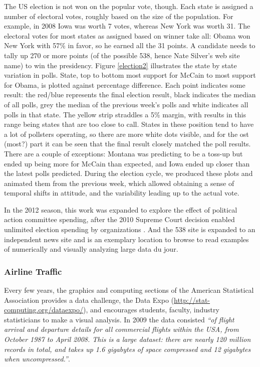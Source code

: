 \documentclass{article}
\begin{document}
The US election is not won on the popular vote, though. Each state is assigned a number of electoral votes, roughly based on the size of the population. For example, in 2008 Iowa was worth 7 votes, whereas New York was worth 31. The electoral votes for most states as assigned based on winner take all: Obama won New York with 57\% in favor, so he earned all the 31 points. A candidate needs to tally up 270 or more points (of the possible 538, hence Nate Silver's web site name) to win the presidency. Figure \ref{election2} illustrates the state by state variation in polls. State, top to bottom most support for McCain to most support for Obama, is plotted against percentage difference. Each point indicates some result: the red/blue represents the final election result, black indicates the median of all polls, grey the median of the previous week's polls and white indicates all polls in that state. The yellow strip straddles a 5\% margin, with results in this range being states that are too close to call. States in these position tend to have a lot of pollsters operating, so there are more white dots visible, and for the ost{\color[rgb]{0,0,1} (most?)}  part it can be seen that the final result closely matched the poll results. There are a couple of exceptions: Montana was predicting to be a toss-up but ended up being more for McCain than expected, and Iowa ended up closer than the latest polls predicted. During the election cycle, we produced these plots and animated them from the previous week, which allowed obtaining a sense of temporal shifts in attitude, and the variability leading up to the actual vote.

In the 2012 season, this work was expanded to explore the effect of political action committee spending, after the 2010 Supreme Court decision enabled unlimited election spending by organizations \citep{kaplan2012}. And the 538 site is expanded to an independent news site and is an exemplary location to browse to read examples of numerically and visually analyzing large data du jour.

\subsubsection{Airline Traffic}

Every few years, the graphics and computing sections of the American Statistical Association provides a data challenge, the Data Expo (\url{http://stat-computing.org/dataexpo/}), and encourages students, faculty, industry statisticians to make a visual analysis. In 2009 the data consisted {\em ``of flight arrival and departure details for all commercial flights within the USA, from October 1987 to April 2008. This is a large dataset: there are nearly 120 million records in total, and takes up 1.6 gigabytes of space compressed and 12 gigabytes when uncompressed.''}.
\end{document}
